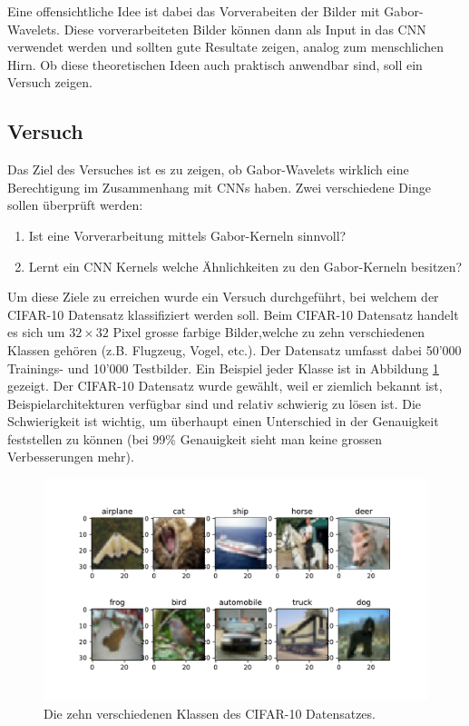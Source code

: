 Eine offensichtliche Idee ist dabei das Vorverabeiten der Bilder mit Gabor-Wavelets.
Diese vorverarbeiteten Bilder können dann als Input in das CNN verwendet werden und sollten gute Resultate zeigen, analog zum menschlichen Hirn.
Ob diese theoretischen Ideen auch praktisch anwendbar sind, soll ein Versuch zeigen.

\subsection{Versuch}

Das Ziel des Versuches ist es zu zeigen, ob Gabor-Wavelets wirklich eine Berechtigung im Zusammenhang mit CNNs haben.
Zwei verschiedene Dinge sollen überprüft werden:
\begin{enumerate}
	\item Ist eine Vorverarbeitung mittels Gabor-Kerneln sinnvoll?
	\item Lernt ein CNN Kernels welche Ähnlichkeiten zu den Gabor-Kerneln besitzen?
\end{enumerate}
Um diese Ziele zu erreichen wurde ein Versuch durchgeführt, bei welchem der CIFAR-10 \cite{paper:cifar10} Datensatz klassifiziert werden soll.
%
Beim CIFAR-10 Datensatz handelt es sich um $32 \times 32$ Pixel grosse farbige Bilder,welche zu zehn verschiedenen Klassen gehören (z.B. Flugzeug, Vogel, etc.).
Der Datensatz umfasst dabei 50'000 Trainings- und 10'000 Testbilder.
Ein Beispiel jeder Klasse ist in Abbildung \ref{fig:cifar10} gezeigt.
Der CIFAR-10 Datensatz wurde gewählt, weil er ziemlich bekannt ist, Beispielarchitekturen verfügbar sind und relativ schwierig zu lösen ist.
Die Schwierigkeit ist wichtig, um überhaupt einen Unterschied in der Genauigkeit feststellen zu können (bei 99\% Genauigkeit sieht man keine grossen Verbesserungen mehr).

\begin{figure}
	\centering
	\includegraphics[width=1.0\linewidth, trim=0 60 0 40, clip]{./papers/visuell/images/cifar10}
	\caption{Die zehn verschiedenen Klassen des CIFAR-10 Datensatzes.}
	\label{fig:cifar10}
\end{figure}

